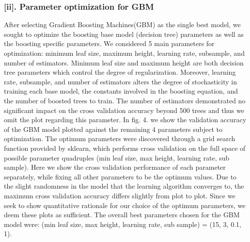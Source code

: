\newpage

\subsubsection*{[ii]. Parameter optimization for GBM}
After selecting Gradient Boosting Machines(GBM) as the single best model, we sought to optimize the boosting base model (decision tree) parameters as well as the boosting specific parameters. We considered 5 main parameters for optimization: minimum leaf size, maximum height, learning rate, subsample, and number of estimators. Minimum leaf size and maximum height are both decision tree parameters which control the degree of regularization. Moreover, learning rate, subsample, and number of estimators alters the degree of stochasticity in training each base model, the constants involved in the boosting equation, and the number of boosted trees to train. The number of estimators demonstrated no significant impact on the cross validation accuracy beyond 500 trees and thus we omit the plot regarding this parameter. In fig. 4. we show the validation accuracy of the GBM model plotted against the remaining 4 parameters subject to optimization. The optimum parameters were discovered through a grid search function provided by sklearn, which performs cross validation on the full space of possible parameter quadruples (min leaf size, max height, learning rate, sub sample). Here we show the cross validation performance of each parameter separately, while fixing all other parameters to be the optimum values. Due to the slight randomness in the model that the learning algorithm converges to, the maximum cross validation accuracy differs slightly from plot to plot. Since we seek to show quantitative rationale for our choice of the optimum parameters, we deem these plots as sufficient. The overall best parameters chosen for the GBM model were: (min leaf size, max height, learning rate, sub sample) = (15, 3, 0.1, 1).

